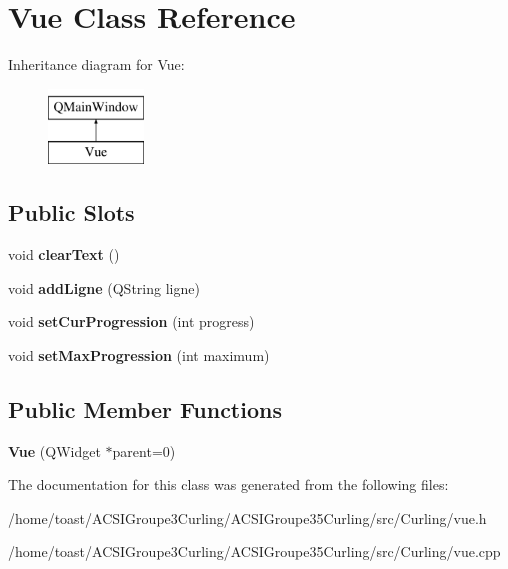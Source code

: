 \hypertarget{class_vue}{\section{Vue Class Reference}
\label{class_vue}
}
Inheritance diagram for Vue\-:\begin{figure}[H]
\begin{center}
\leavevmode
\includegraphics[height=2.000000cm]{class_vue}
\end{center}
\end{figure}
\subsection*{Public Slots}
\begin{DoxyCompactItemize}
\item 
\hypertarget{class_vue_a70c0db80a2d27eb8097642b46e97f2d5}{void {\bfseries clear\-Text} ()}\label{class_vue_a70c0db80a2d27eb8097642b46e97f2d5}

\item 
\hypertarget{class_vue_a71ae3f141fca897300185b8c2f9cc5c4}{void {\bfseries add\-Ligne} (Q\-String ligne)}\label{class_vue_a71ae3f141fca897300185b8c2f9cc5c4}

\item 
\hypertarget{class_vue_a36b773de47a200df9f9c738c54678a55}{void {\bfseries set\-Cur\-Progression} (int progress)}\label{class_vue_a36b773de47a200df9f9c738c54678a55}

\item 
\hypertarget{class_vue_a7140f640094b400318bf413313243ebf}{void {\bfseries set\-Max\-Progression} (int maximum)}\label{class_vue_a7140f640094b400318bf413313243ebf}

\end{DoxyCompactItemize}
\subsection*{Public Member Functions}
\begin{DoxyCompactItemize}
\item 
\hypertarget{class_vue_a10e5079d33b1916e6c38a698c92fa1e9}{{\bfseries Vue} (Q\-Widget $\ast$parent=0)}\label{class_vue_a10e5079d33b1916e6c38a698c92fa1e9}

\end{DoxyCompactItemize}


The documentation for this class was generated from the following files\-:\begin{DoxyCompactItemize}
\item 
/home/toast/\-A\-C\-S\-I\-Groupe3\-Curling/\-A\-C\-S\-I\-Groupe35\-Curling/src/\-Curling/vue.\-h\item 
/home/toast/\-A\-C\-S\-I\-Groupe3\-Curling/\-A\-C\-S\-I\-Groupe35\-Curling/src/\-Curling/vue.\-cpp\end{DoxyCompactItemize}
